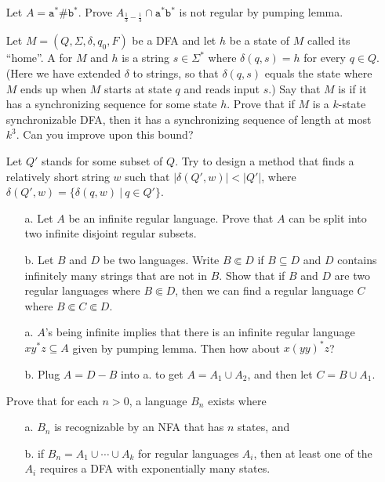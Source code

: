 \begin{itemize}
	\hint
	Let $A = \mathtt{a}^* \texttt{\#} \mathtt{b}^*$. Prove $A_{\frac{1}{3}-\frac{1}{3}} \cap \mathtt{a}^* \mathtt{b}^*$ is not regular by pumping lemma.
	
	
	\item[\hard 1.59]
	Let $M = (Q, \Sigma, \delta, q_0, F)$ be a DFA and let $h$ be a state of $M$ called its ``home''. A  for $M$ and $h$ is a string $s \in \Sigma^*$ where $\delta(q, s) = h$ for every $q \in Q$. (Here we have extended $\delta$ to strings, so that $\delta(q, s)$ equals the state where $M$ ends up when $M$ starts at state $q$ and reads input $s$.) Say that $M$ is  if it has a synchronizing sequence for some state $h$. Prove that if $M$ is a $k$-state synchronizable DFA, then it has a synchronizing sequence of length at most $k^3$. Can you improve upon this bound?
	
	\hint
	Let $Q'$ stands for some subset of $Q$. Try to design a method that finds a relatively short string $w$ such that $|\delta(Q', w)| < |Q'|$, where $\delta(Q', w) = \{ \delta(q, w) \ | \ q \in Q' \}$.
	
	
	\item[\hard 1.63] 
	\begin{itemize}
		\item[a.]
		Let $A$ be an infinite regular language. Prove that $A$ can be split into two infinite disjoint regular subsets.
		\item[b.]
		Let $B$ and $D$ be two languages. Write $B \Subset D$ if $B \subseteq D$ and $D$ contains infinitely many strings that are not in $B$. Show that if $B$ and $D$ are two regular languages where $B \Subset D$, then we can find a regular language $C$ where $B \Subset C \Subset D$.
	\end{itemize}

	\hint
	\begin{itemize}
		\item[a.]
		$A$'s being infinite implies that there is an infinite regular language $x y^* z \subseteq A$ given by pumping lemma. Then how about $x (yy)^* z$?
		\item[b.]
		Plug $A = D - B$ into a. to get $A = A_1 \cup A_2$, and then let $C = B \cup A_1$.
	\end{itemize}


	\item[\hard 1.65]
	Prove that for each $n>0$, a language $B_n$ exists where
	\begin{itemize}
		\item[a.]
		$B_n$ is recognizable by an NFA that has $n$ states, and
		\item[b.]
		if $B_n = A_1 \cup \cdots \cup A_k$ for regular languages $A_i$, then at least one of the $A_i$ requires a DFA with exponentially many states.
	\end{itemize}


\end{itemize}
